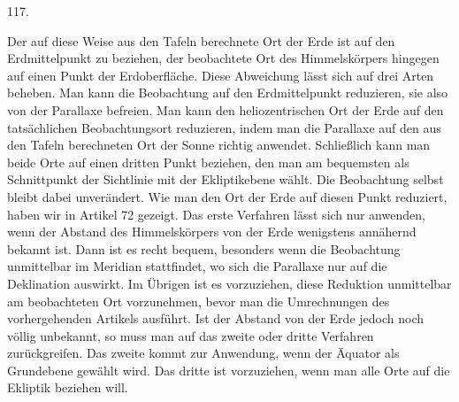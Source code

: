 \par\medskip
\begin{center}\hypertarget{native-164-article117}{}117.\end{center}
Der auf diese Weise aus den Tafeln berechnete Ort der Erde ist auf den Erdmittelpunkt zu beziehen, der beobachtete Ort des Himmelskörpers hingegen auf einen Punkt der Erdoberfläche. Diese Abweichung lässt sich auf drei Arten beheben. Man kann die Beobachtung auf den Erdmittelpunkt reduzieren, sie also von der Parallaxe befreien. Man kann den heliozentrischen Ort der Erde auf den tatsächlichen Beobachtungsort reduzieren, indem man die Parallaxe auf den aus den Tafeln berechneten Ort der Sonne richtig anwendet. Schließlich kann man beide Orte auf einen dritten Punkt beziehen, den man am bequemsten als Schnittpunkt der Sichtlinie mit der Ekliptikebene wählt. Die Beobachtung selbst bleibt dabei unverändert. Wie man den Ort der Erde auf diesen Punkt reduziert, haben wir in Artikel 72 gezeigt. Das erste Verfahren lässt sich nur anwenden, wenn der Abstand des Himmelskörpers von der Erde wenigstens annähernd bekannt ist. Dann ist es recht bequem, besonders wenn die Beobachtung unmittelbar im Meridian stattfindet, wo sich die Parallaxe nur auf die Deklination auswirkt. Im Übrigen ist es vorzuziehen, diese Reduktion unmittelbar am beobachteten Ort vorzunehmen, bevor man die Umrechnungen des vorhergehenden Artikels ausführt. Ist der Abstand von der Erde jedoch noch völlig unbekannt, so muss man auf das zweite oder dritte Verfahren zurückgreifen. Das zweite kommt zur Anwendung, wenn der Äquator als Grundebene gewählt wird. Das dritte ist vorzuziehen, wenn man alle Orte auf die Ekliptik beziehen will.
